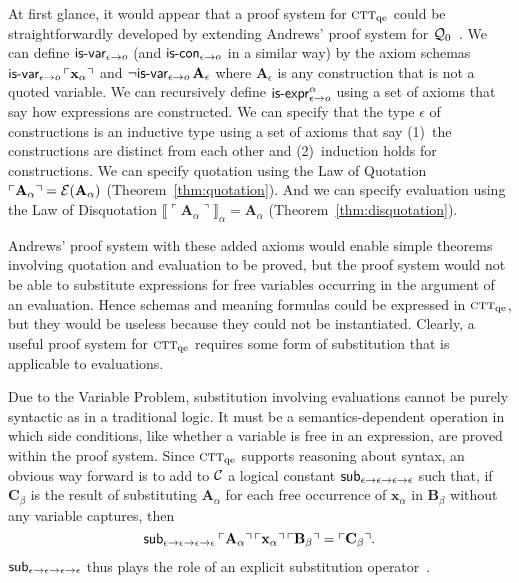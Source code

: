 \documentclass[fleqn]{llncs}
\newcommand{\bsp}{\begin{sloppypar}}
\newcommand{\esp}{\end{sloppypar}}
\newcommand{\sC}{\mbox{$\cal C$}}
\newcommand{\sE}{\mbox{$\cal E$}}
\newcommand{\churchqe}{$\mbox{\sc ctt}_{\rm qe}$}
\newcommand{\qzero}{${\cal Q}_0$}
\newcommand{\sembrack}[1]{\llbracket#1\rrbracket}
\newcommand{\synbrack}[1]{\ulcorner#1\urcorner}
\newcommand{\mname}[1]{\mbox{\sf #1}}
\newcommand{\tarrow}{\rightarrow}
\newcommand{\Neg}{\neg}
\begin{document}
\bsp 
At first glance, it would appear that a proof system for {\churchqe}
could be straightforwardly developed by extending Andrews' proof
system for {\qzero}~\cite[p.~213]{Andrews02}.  We can define
$\mname{is-var}_{\epsilon \tarrow o}$ (and $\mname{is-con}_{\epsilon
  \tarrow o}$ in a similar way) by the axiom schemas
$\mname{is-var}_{\epsilon \tarrow o} \, \synbrack{\textbf{x}_\alpha}$
and $\Neg\mname{is-var}_{\epsilon \tarrow o} \, \textbf{A}_\epsilon$
where $\textbf{A}_\epsilon$ is any construction that is not a quoted
variable.  We can recursively define $\mname{is-expr}_{\epsilon
  \tarrow o}^{\alpha}$ using a set of axioms that say how expressions
are constructed.  We can specify that the type $\epsilon$ of
constructions is an inductive type using a set of axioms that say
(1)~the constructions are distinct from each other and (2)~induction
holds for constructions.  We can specify quotation using the Law of
Quotation $\synbrack{\textbf{A}_\alpha} = \sE(\textbf{A}_\alpha)$
(Theorem~\ref{thm:quotation}).  And we can specify evaluation using
the Law of Disquotation
$\sembrack{\synbrack{\textbf{A}_\alpha}}_\alpha = \textbf{A}_\alpha$
(Theorem~\ref{thm:disquotation}).
\esp

Andrews' proof system with these added axioms would enable simple
theorems involving quotation and evaluation to be proved, but the
proof system would not be able to substitute expressions for free
variables occurring in the argument of an evaluation.  Hence schemas
and meaning formulas could be expressed in {\churchqe}, but they would
be useless because they could not be instantiated. Clearly, a useful
proof system for {\churchqe} requires some form of substitution that
is applicable to evaluations.

Due to the Variable Problem, substitution involving evaluations cannot
be purely syntactic as in a traditional logic.  It must be a
semantics-dependent operation in which side conditions, like whether a
variable is free in an expression, are proved within the proof system.
Since {\churchqe} supports reasoning about syntax, an obvious way
forward is to add to $\sC$ a logical constant $\mname{sub}_{\epsilon
  \tarrow \epsilon \tarrow \epsilon \tarrow \epsilon}$ such that, if
$\textbf{C}_\beta$ is the result of substituting $\textbf{A}_\alpha$
for each free occurrence of $\textbf{x}_\alpha$ in $\textbf{B}_\beta$
without any variable captures, then
\[\mname{sub}_{\epsilon \tarrow \epsilon \tarrow \epsilon \tarrow
  \epsilon} \, \synbrack{\textbf{A}_\alpha} \,
\synbrack{\textbf{x}_\alpha} \, \synbrack{\textbf{B}_\beta} =
\synbrack{\textbf{C}_\beta}.\] $\mname{sub}_{\epsilon \tarrow \epsilon
  \tarrow \epsilon \tarrow \epsilon}$ thus plays the role of an
explicit substitution operator~\cite{AbadiEtAl91}.
\end{document}

